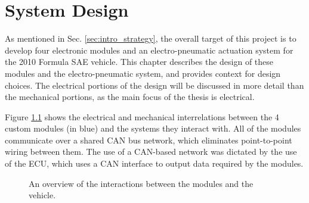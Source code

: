 \chapter{System Design\label{cha:design}}

As mentioned in Sec. \ref{sec:intro_strategy}, the overall target of this project is to develop four electronic modules and an electro-pneumatic actuation system for the 2010 Formula SAE vehicle. This chapter describes the design of these modules and the electro-pneumatic system, and provides context for design choices. The electrical portions of the design will be discussed in more detail than the mechanical portions, as the main focus of the thesis is electrical. 

Figure \ref{fig:design_overview} shows the electrical and mechanical interrelations between the 4 custom modules (in blue) and the systems they interact with. All of the modules communicate over a shared CAN bus network, which eliminates point-to-point wiring between them. The use of a CAN-based network was dictated by the use of the ECU, which uses a CAN interface to output data required by the modules. 

\begin{figure}[H]
\centering

\caption{An overview of the interactions between the modules and the vehicle.}
\label{fig:design_overview}
\end{figure}





